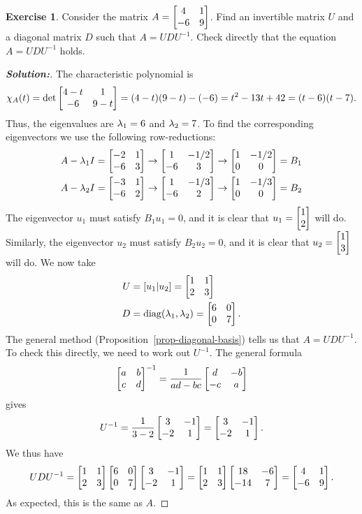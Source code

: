 \documentclass[a4paper]{amsart}
\theoremstyle{definition}
\newtheorem{exercise}{Exercise}
\newenvironment{solution}{\begin{proof}[\textbf{Solution:}] \vphantom{u}}{\end{proof}}
\begin{document}
\begin{exercise}\label{ex-diagonal-i}
 Consider the matrix $A=\left[\begin{matrix} 4&1\\ -6&9\end{matrix}\right]$.  Find an invertible 
 matrix $U$ and a diagonal matrix $D$ such that $A=UDU^{-1}$.  Check
 directly that the equation $A=UDU^{-1}$ holds.
\end{exercise}
\begin{solution}
 The characteristic polynomial is
 \[ \chi_A(t)
      = \det\left[\begin{matrix} 4-t & 1 \\ -6 & 9-t \end{matrix}\right] 
      = (4-t)(9-t) - (-6) = t^2 -13t +42 = (t-6)(t-7).
 \]
 Thus, the eigenvalues are $\lambda_1=6$ and $\lambda_2=7$.  To find the
 corresponding eigenvectors we use the following row-reductions:
 \begin{align*}
  A-\lambda_1I &= \left[\begin{matrix} -2&1 \\ -6&3 \end{matrix}\right] 
            \to \left[\begin{matrix} 1&-1/2 \\ -6&3 \end{matrix}\right] 
            \to \left[\begin{matrix} 1&-1/2 \\ 0&0 \end{matrix}\right] 
            = B_1 \\
  A-\lambda_2I &= \left[\begin{matrix} -3&1 \\ -6&2 \end{matrix}\right] 
            \to \left[\begin{matrix} 1&-1/3 \\ -6&2 \end{matrix}\right] 
            \to \left[\begin{matrix} 1&-1/3 \\ 0&0 \end{matrix}\right] 
            = B_2
 \end{align*}
 The eigenvector $u_1$ must satisfy $B_1u_1=0$, and it is clear that
 $u_1=\left[\begin{matrix} 1\\2\end{matrix}\right]$ will do.   Similarly, the eigenvector $u_2$ must
 satisfy $B_2u_2=0$, and it is clear that $u_2=\left[\begin{matrix} 1\\3\end{matrix}\right]$ will do.
 We now take
 \begin{align*}
  U &= [u_1|u_2] = \left[\begin{matrix} 1 & 1 \\ 2 & 3 \end{matrix}\right] \\
  D &= \operatorname{diag}(\lambda_1,\lambda_2) = \left[\begin{matrix} 6 & 0 \\ 0 & 7 \end{matrix}\right].
 \end{align*}
 The general method (Proposition~\ref{prop-diagonal-basis}) tells us
 that $A=UDU^{-1}$.  To check this directly, we need to work out
 $U^{-1}$.  The general formula
 \[ \left[\begin{matrix} a&b\\ c&d\end{matrix}\right]^{-1} = \frac{1}{ad-bc}\left[\begin{matrix} d&-b \\-c&a\end{matrix}\right] \]
 gives 
 \[ U^{-1}=\frac{1}{3-2}\left[\begin{matrix} 3&-1\\-2&1\end{matrix}\right] = \left[\begin{matrix} 3&-1\\-2&1\end{matrix}\right]. \]
 We thus have
 \[ UDU^{-1} = 
     \left[\begin{matrix} 1 & 1 \\ 2 & 3 \end{matrix}\right]
     \left[\begin{matrix} 6 & 0 \\ 0 & 7 \end{matrix}\right]
     \left[\begin{matrix} 3 & -1\\ -2 & 1 \end{matrix}\right] =
     \left[\begin{matrix} 1 & 1 \\ 2 & 3 \end{matrix}\right]
     \left[\begin{matrix} 18 & -6 \\ -14 & 7 \end{matrix}\right] =
     \left[\begin{matrix} 4 & 1 \\ -6 & 9 \end{matrix}\right].
 \]
 As expected, this is the same as $A$.
\end{solution}
\end{document}
